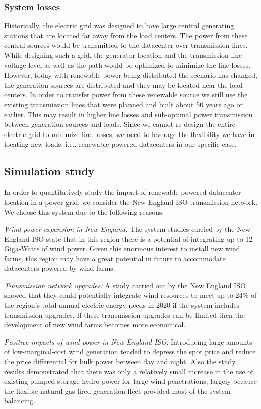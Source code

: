 \subsubsection{System losses}
Historically, the electric grid was designed to have large central generating stations that are located far away from the load centers. The power from these central sources would be transmitted to the datacenter over transmission lines. While designing such a grid, the generator location and the transmission line voltage level as well as the path would be optimized to minimize the line losses.  However, today with renewable power being distributed the scenario has changed, the generation sources are distributed and they may be located near the load centers. In order to transfer power from these renewable source we still use the existing transmission lines that were planned and built about 50 years ago or earlier. This may result in higher line losses and sub-optimal power transmission between generation sources and loads. Since we cannot re-design the entire electric grid to minimize line losses, we need to leverage the flexibility we have in locating new loads, i.e., renewable powered datacenters in our specific case.


\subsection{Simulation study}
In order to quantitatively study the impact of renewable powered datacenter location in a power grid, we consider the New England ISO transmission network. We choose this system due to the following reasons:

{\em Wind power expansion in New England:} The system studies carried by the New England ISO state that in this region there is a potential of integrating up to 12 Giga-Watts of wind power. Given this enormous interest to install new wind farms, this region may have a great potential in future to accommodate datacenters powered by wind farms.

{\em Transmission network upgrades:} A study carried out by the New England ISO showed that they could potentially integrate wind resources to meet up to 24\% of the region's total annual electric energy needs in 2020 if the system includes transmission
upgrades. If these transmission upgrades can be limited then the development of new wind farms becomes more economical.

{\em Positive impacts of wind power in New England ISO:} Introducing large amounts of low-marginal-cost wind generation tended to depress the spot price and reduce the price differential for bulk power between day and night. Also the study results demonstrated that there was only a relatively small increase in the use of existing pumped-storage hydro power for large wind penetrations, largely because the flexible natural-gas-fired generation fleet provided most of the system balancing.

